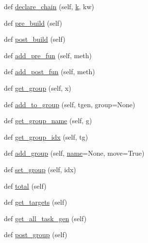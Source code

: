 \begin{DoxyCompactItemize}
\item 
def \hyperlink{classwaflib_1_1_build_1_1_build_context_a6d24341f3d68e2a5a3987300d3d017fa}{declare\+\_\+chain} (self, \hyperlink{rfft2d_test_m_l_8m_adc468c70fb574ebd07287b38d0d0676d}{k}, kw)
\item 
def \hyperlink{classwaflib_1_1_build_1_1_build_context_a31b06f39986abefe3e129998b079f679}{pre\+\_\+build} (self)
\item 
def \hyperlink{classwaflib_1_1_build_1_1_build_context_aa8a25dd6bc5b621fa21d9806525e03df}{post\+\_\+build} (self)
\item 
def \hyperlink{classwaflib_1_1_build_1_1_build_context_a6ebf18db9a2bccd92de1506d261d7f03}{add\+\_\+pre\+\_\+fun} (self, meth)
\item 
def \hyperlink{classwaflib_1_1_build_1_1_build_context_a64d6fb9f73868bc70922fabaa0682fef}{add\+\_\+post\+\_\+fun} (self, meth)
\item 
def \hyperlink{classwaflib_1_1_build_1_1_build_context_ae9d4d76df236217e6c1ba262df1a7376}{get\+\_\+group} (self, x)
\item 
def \hyperlink{classwaflib_1_1_build_1_1_build_context_a4454ed8386bb714afcd240eedc360720}{add\+\_\+to\+\_\+group} (self, tgen, group=None)
\item 
def \hyperlink{classwaflib_1_1_build_1_1_build_context_a70172b57dd578379f3de337a479d1463}{get\+\_\+group\+\_\+name} (self, g)
\item 
def \hyperlink{classwaflib_1_1_build_1_1_build_context_a8b0e6338acd281989d32dd8a1502e745}{get\+\_\+group\+\_\+idx} (self, tg)
\item 
def \hyperlink{classwaflib_1_1_build_1_1_build_context_a9e1a6200ab3e854ecc9041a5e9abaa78}{add\+\_\+group} (self, \hyperlink{lib_2expat_8h_a1b49b495b59f9e73205b69ad1a2965b0}{name}=None, move=True)
\item 
def \hyperlink{classwaflib_1_1_build_1_1_build_context_a00550c82b40990a204a19c29aee9bfe6}{set\+\_\+group} (self, idx)
\item 
def \hyperlink{classwaflib_1_1_build_1_1_build_context_a9242bac9596041fb6e91bd4f7cdbac51}{total} (self)
\item 
def \hyperlink{classwaflib_1_1_build_1_1_build_context_a11f1e63e72833ad88c0d58ffb29342d6}{get\+\_\+targets} (self)
\item 
def \hyperlink{classwaflib_1_1_build_1_1_build_context_a534cef50b471df8c60a8392209465f7f}{get\+\_\+all\+\_\+task\+\_\+gen} (self)
\item 
def \hyperlink{classwaflib_1_1_build_1_1_build_context_ae2c4605b1c701d8421f922205621f9df}{post\+\_\+group} (self)

\end{DoxyCompactItemize}
